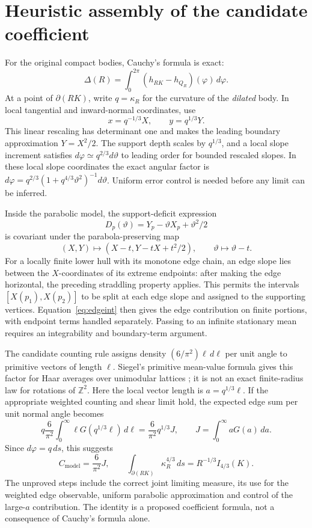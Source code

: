 \documentclass[11pt,a4paper]{article}
\newcommand{\Z}{\mathbb Z}
\newcommand{\Cmodel}{C_{\mathrm{model}}}
\begin{document}
\section{Heuristic assembly of the candidate coefficient}
For the original compact bodies, Cauchy's formula is exact:
\begin{equation}\label{eq:cauchy}
 \Delta(R)=\int_0^{2\pi}(h_{RK}-h_{Q_R})(\varphi)\,d\varphi.
\end{equation}
At a point of $\partial(RK)$, write $q=\kappa_R$ for the curvature of the \emph{dilated} body. In local tangential and inward-normal coordinates, use
\[
 x=q^{-1/3}X,\qquad y=q^{1/3}Y.
\]
This linear rescaling has determinant one and makes the leading boundary approximation $Y=X^2/2$. The support depth scales by $q^{1/3}$, and a local slope increment satisfies $d\varphi\simeq q^{2/3}d\vartheta$ to leading order for bounded rescaled slopes. In these local slope coordinates the exact angular factor is $d\varphi=q^{2/3}(1+q^{4/3}\vartheta^2)^{-1}d\vartheta$. Uniform error control is needed before any limit can be inferred.

Inside the parabolic model, the support-deficit expression
\[
 D_p(\vartheta)=Y_p-\vartheta X_p+\vartheta^2/2
\]
is covariant under the parabola-preserving map
\[
 (X,Y)\mapsto(X-t,Y-tX+t^2/2),\qquad \vartheta\mapsto\vartheta-t.
\]
For a locally finite lower hull with its monotone edge chain, an edge slope lies between the $X$-coordinates of its extreme endpoints: after making the edge horizontal, the preceding straddling property applies. This permits the intervals $[X(p_1),X(p_2)]$ to be split at each edge slope and assigned to the supporting vertices. Equation~\eqref{eq:edgeint} then gives the edge contribution on finite portions, with endpoint terms handled separately. Passing to an infinite stationary mean requires an integrability and boundary-term argument.

The candidate counting rule assigns density $(6/\pi^2)\ell\,d\ell$ per unit angle to primitive vectors of length $\ell$. Siegel's primitive mean-value formula gives this factor for Haar averages over unimodular lattices \cite{S}; it is not an exact finite-radius law for rotations of $\Z^2$. Here the local vector length is $a=q^{1/3}\ell$. If the appropriate weighted counting and shear limit hold, the expected edge sum per unit normal angle becomes
\[
 q\frac6{\pi^2}\int_0^\infty\ell G(q^{1/3}\ell)\,d\ell
 =\frac6{\pi^2}q^{1/3}J,\qquad
 J=\int_0^\infty aG(a)\,da.
\]
Since $d\varphi=q\,ds$, this suggests
\[
 \Cmodel=\frac6{\pi^2}J,\qquad
 \int_{\partial(RK)}\kappa_R^{4/3}\,ds=R^{-1/3}I_{4/3}(K).
\]
The unproved steps include the correct joint limiting measure, its use for the weighted edge observable, uniform parabolic approximation and control of the large-$a$ contribution. The identity is a proposed coefficient formula, not a consequence of Cauchy's formula alone.
\end{document}
